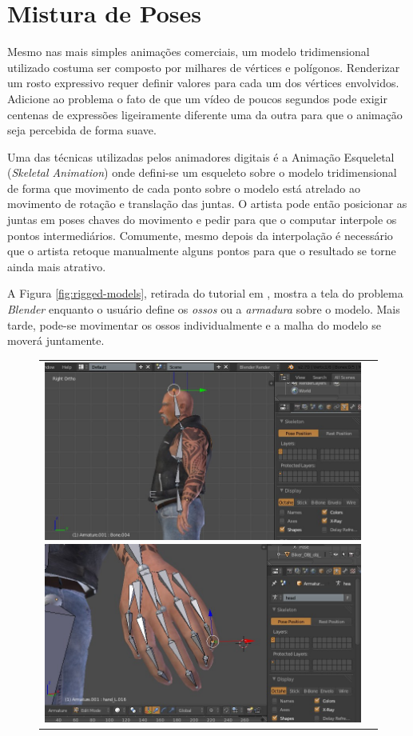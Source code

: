 {\section{Mistura de Poses}

	Mesmo nas mais simples animações comerciais, um modelo tridimensional utilizado costuma ser composto por milhares de vértices e polígonos. Renderizar um rosto expressivo requer definir valores para cada um dos vértices envolvidos. Adicione ao problema o fato de que um vídeo de poucos segundos pode exigir centenas de expressões ligeiramente diferente uma da outra para que o animação seja percebida de forma suave.
    
    Uma das técnicas utilizadas pelos animadores digitais é a Animação Esqueletal (\textit{Skeletal Animation}) onde defini-se um esqueleto sobre o modelo tridimensional de forma que movimento de cada ponto sobre o modelo está atrelado ao movimento de rotação e translação das juntas. O artista pode então posicionar as juntas em poses chaves do movimento e pedir para que o computar interpole os pontos intermediários. Comumente, mesmo depois da interpolação é necessário que o artista retoque manualmente alguns pontos para que o resultado se torne ainda mais atrativo.
    
    A Figura \ref{fig:rigged-models}, retirada do tutorial em \cite{rigs-tutorial}, mostra a tela do problema \textit{Blender} enquanto o usuário define os \textit{ossos} ou a \textit{armadura} sobre o modelo. Mais tarde, pode-se movimentar os ossos individualmente e a malha do modelo se moverá juntamente.
    
    
\begin{figure}[!htb]
   \centering
\begin{tabular}{cc}
  \includegraphics[width=0.4\linewidth]{./figs/blender_armature_image.jpg}
  \includegraphics[width=0.4\linewidth]{./figs/blender_armature_image_14.jpg}
\end{tabular}


\end{figure}}

